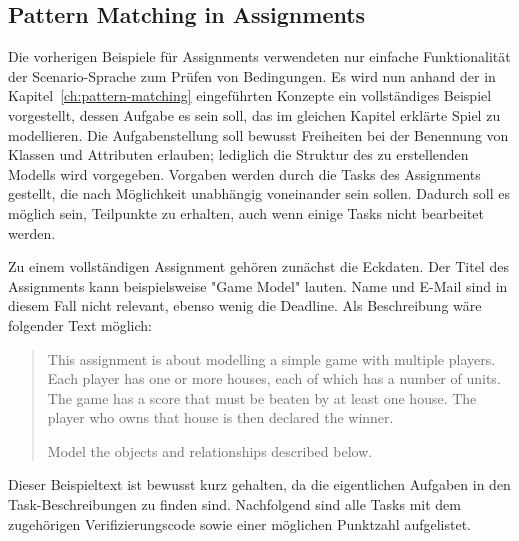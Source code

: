\subsection{Pattern Matching in Assignments}\label{subsec:assignment-pattern-matching}

Die vorherigen Beispiele für Assignments verwendeten nur einfache Funktionalität der Scenario-Sprache zum Prüfen von Bedingungen.
Es wird nun anhand der in Kapitel~\ref{ch:pattern-matching} eingeführten Konzepte ein vollständiges Beispiel vorgestellt, dessen Aufgabe es sein soll, das im gleichen Kapitel erklärte Spiel zu modellieren.
Die Aufgabenstellung soll bewusst Freiheiten bei der Benennung von Klassen und Attributen erlauben;
lediglich die Struktur des zu erstellenden Modells wird vorgegeben.
Vorgaben werden durch die Tasks des Assignments gestellt, die nach Möglichkeit unabhängig voneinander sein sollen.
Dadurch soll es möglich sein, Teilpunkte zu erhalten, auch wenn einige Tasks nicht bearbeitet werden.

Zu einem vollständigen Assignment gehören zunächst die Eckdaten.
Der Titel des Assignments kann beispielsweise "Game Model" lauten.
Name und E-Mail sind in diesem Fall nicht relevant, ebenso wenig die Deadline.
Als Beschreibung wäre folgender Text möglich:

\begin{quote}
    This assignment is about modelling a simple game with multiple players.
    Each player has one or more houses, each of which has a number of units.
    The game has a score that must be beaten by at least one house.
    The player who owns that house is then declared the winner.

    Model the objects and relationships described below.
\end{quote}

Dieser Beispieltext ist bewusst kurz gehalten, da die eigentlichen Aufgaben in den Task-Beschreibungen zu finden sind.
Nachfolgend sind alle Tasks mit dem zugehörigen Verifizierungscode sowie einer möglichen Punktzahl aufgelistet.

